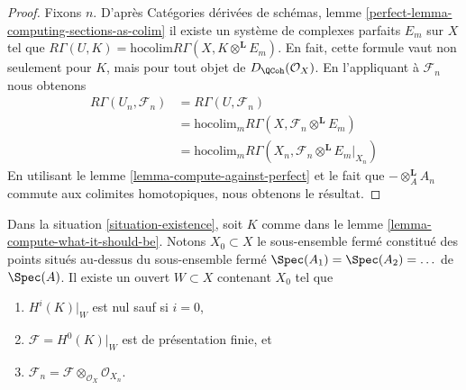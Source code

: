 \begin{proof}
Fixons $n$. D'après Catégories dérivées de schémas, lemme
\ref{perfect-lemma-computing-sections-as-colim}
il existe un système de complexes parfaits $E_m$
sur $X$ tel que
$R\Gamma(U, K) = \text{hocolim} R\Gamma(X, K \otimes^\mathbf{L} E_m)$.
En fait, cette formule vaut non seulement pour $K$, mais pour tout objet de
$D_\QCoh(\mathcal{O}_X)$.
En l'appliquant à $\mathcal{F}_n$
nous obtenons
\begin{align*}
R\Gamma(U_n, \mathcal{F}_n)
& =
R\Gamma(U, \mathcal{F}_n) \\
& =
\text{hocolim}_m R\Gamma(X, \mathcal{F}_n \otimes^\mathbf{L} E_m) \\
& =
\text{hocolim}_m R\Gamma(X_n, \mathcal{F}_n \otimes^\mathbf{L} E_m|_{X_n})
\end{align*}
En utilisant le lemme \ref{lemma-compute-against-perfect}
et le fait que $- \otimes_A^\mathbf{L} A_n$
commute aux colimites homotopiques, nous obtenons le résultat.
\end{proof}

\begin{lemma}
\label{lemma-finitely-presented}
Dans la situation \ref{situation-existence}, soit $K$ comme dans le
lemme \ref{lemma-compute-what-it-should-be}.
Notons $X_0 \subset X$ le sous-ensemble fermé
constitué des points situés au-dessus du sous-ensemble fermé
$\Spec(A_1) = \Spec(A_2) = \ldots$ de $\Spec(A)$.
Il existe un ouvert $W \subset X$ contenant $X_0$
tel que
\begin{enumerate}
\item $H^i(K)|_W$ est nul sauf si $i = 0$,
\item $\mathcal{F} = H^0(K)|_W$ est de présentation finie, et
\item $\mathcal{F}_n = \mathcal{F} \otimes_{\mathcal{O}_X} \mathcal{O}_{X_n}$.
\end{enumerate}
\end{lemma}

